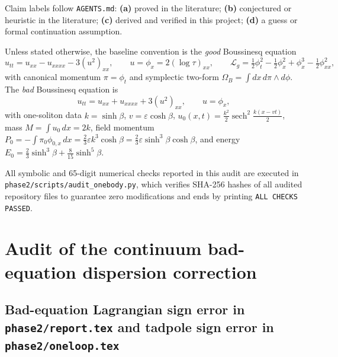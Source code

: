 \documentclass[11pt,a4paper]{article}
\newcommand{\claim}[1]{\textbf{(#1)}}
\begin{document}
Claim labels follow \texttt{AGENTS.md}:
\claim{a} proved in the literature;
\claim{b} conjectured or heuristic in the literature;
\claim{c} derived and verified in this project;
\claim{d} a guess or formal continuation assumption.

Unless stated otherwise, the baseline convention is the \emph{good} Boussinesq equation
\begin{equation}
  u_{tt} = u_{xx} - u_{xxxx} - 3(u^2)_{xx}, \qquad
  u = \phi_x = 2(\log\tau)_{xx}, \qquad
  \mathcal{L}_g = \tfrac{1}{2}\phi_t^2 - \tfrac{1}{2}\phi_x^2 + \phi_x^3 - \tfrac{1}{2}\phi_{xx}^2,
  \label{eq:good-conv}
\end{equation}
with canonical momentum $\pi = \phi_t$ and symplectic two-form $\Omega_B = \int dx\,d\pi\wedge d\phi$.
The \emph{bad} Boussinesq equation is
\begin{equation}
  u_{tt} = u_{xx} + u_{xxxx} + 3(u^2)_{xx}, \qquad u = \phi_x,
  \label{eq:bad-pde}
\end{equation}
with one-soliton data $k = \sinh\beta$, $v = \varepsilon\cosh\beta$,
$u_0(x,t) = \frac{k^2}{2}\operatorname{sech}^2\frac{k(x-vt)}{2}$,
mass $M = \int u_0\,dx = 2k$, field momentum
$P_0 = -\int \pi_0\phi_{0,x}\,dx = \frac{2}{3}\varepsilon k^3\cosh\beta = \frac{2}{3}\varepsilon\sinh^3\beta\cosh\beta$,
and energy $E_0 = \frac{2}{3}\sinh^3\beta + \frac{8}{15}\sinh^5\beta$.

All symbolic and 65-digit numerical checks reported in this audit are executed in
\texttt{phase2/scripts/audit\_onebody.py}, which verifies SHA-256 hashes of all audited repository
files to guarantee zero modifications and ends by printing \texttt{ALL CHECKS PASSED}.

\section{Audit of the continuum bad-equation dispersion correction}

\subsection{Bad-equation Lagrangian sign error in \texttt{phase2/report.tex} and tadpole sign error in \texttt{phase2/oneloop.tex}}
\end{document}
